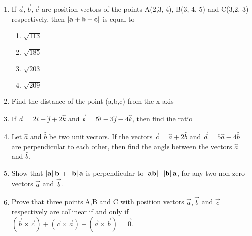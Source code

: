 
\begin{enumerate}
	\item If $ \vec{a},\vec{b}, \vec{c} $ are position vectors of the points A(2,3,-4), B(3,-4,-5) and C(3,2,-3) respectively, then $ \left\vert\mathbf{a}+\mathbf{b}+\mathbf{c}\right\vert $ is equal to
		\begin{enumerate}
			\item $\sqrt{113}$
			\item $\sqrt{185}$
			\item $\sqrt{203}$
			\item $\sqrt{209}$
		\end{enumerate}
\item Find the distance of the point (a,b,c) from the x-axis
\item If $ \vec{a}=2\hat{i}-\hat{j}+2\hat{k} $ and $ \vec{b}=5\hat{i}-3\hat{j}-4\hat{k} $, then find the ratio
\item Let $\hat{a}$ and $\hat{b}$  be two unit vectors. If the vectors $\vec{c}=\hat{a}+2\hat{b}$ and $\vec{d}=5\hat{a}-4\hat{b}$ are perpendicular to each other, then find the angle between the vectors $\hat{a}$ and $\hat{b}$.
\item Show that $ \left\vert\mathbf{a}\right\vert \mathbf{b}$ + $ \left\vert\mathbf{b}\right\vert \mathbf{a}$ is perpendicular to $\left\vert\mathbf{a} \mathbf{b}\right\vert $- $ \left\vert\mathbf{b}\right\vert \mathbf{a} $, for any two non-zero vectors $\vec{a}$ and $\vec{b}$.
\item Prove that three points A,B and C with position vectors $\vec{a}, \vec{b}$ and $\vec{c}$ respectively are collinear if and only if $( \vec{b} \times \vec{c})+(\vec{c} \times \vec{a})+(\vec{a} \times \vec{b}) = \vec{0}$.
\end{enumerate}
